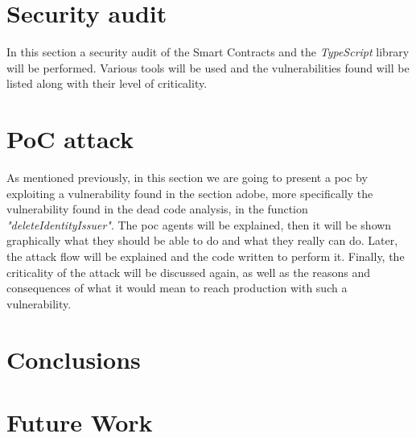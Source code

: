 \documentclass[a4paper, 12pt]{article} %
\begin{document}
\newpage
\section{Security audit}
    In this section a security audit of the Smart Contracts and the \textit{TypeScript} library will be performed. Various tools will be used and the vulnerabilities found will be listed along with their level of criticality.
    
    
    
    
\newpage
\section{PoC attack}
    As mentioned previously, in this section we are going to present a \acrfull{poc} by exploiting a vulnerability found in the section adobe, more specifically the vulnerability found in the dead code analysis, in the function \textit{"deleteIdentityIssuer"}. The \acrshort{poc} agents will be explained, then it will be shown graphically what they should be able to do and what they really can do. Later, the attack flow will be explained and the code written to perform it. Finally, the criticality of the attack will be discussed again, as well as the reasons and consequences of what it would mean to reach production with such a vulnerability.
    
        
    
    
    
    
\newpage
\section{Conclusions}
   
    
\newpage
\section{Future Work}
    
    
\newpage
\printbibliography[heading=bibnumbered] %
\end{document}
